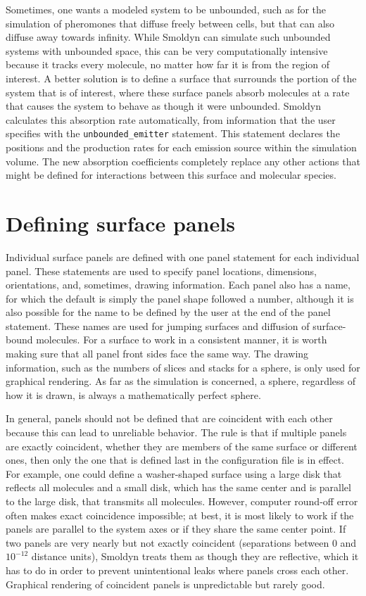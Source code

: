 \documentclass {book}
\newcommand {\ttt} {\texttt}
\begin{document}
Sometimes, one wants a modeled system to be unbounded, such as for the simulation of pheromones that diffuse freely between cells, but that can also diffuse away towards infinity. While Smoldyn can simulate such unbounded systems with unbounded space, this can be very computationally intensive because it tracks every molecule, no matter how far it is from the region of interest. A better solution is to define a surface that surrounds the portion of the system that is of interest, where these surface panels absorb molecules at a rate that causes the system to behave as though it were unbounded. Smoldyn calculates this absorption rate automatically, from information that the user specifies with the \ttt{unbounded\_emitter} statement. This statement declares the positions and the production rates for each emission source within the simulation volume. The new absorption coefficients completely replace any other actions that might be defined for interactions between this surface and molecular species.

\section{Defining surface panels}

Individual surface panels are defined with one panel statement for each individual panel. These statements are used to specify panel locations, dimensions, orientations, and, sometimes, drawing information. Each panel also has a name, for which the default is simply the panel shape followed a number, although it is also possible for the name to be defined by the user at the end of the panel statement. These names are used for jumping surfaces and diffusion of surface-bound molecules. For a surface to work in a consistent manner, it is worth making sure that all panel front sides face the same way. The drawing information, such as the numbers of slices and stacks for a sphere, is only used for graphical rendering. As far as the simulation is concerned, a sphere, regardless of how it is drawn, is always a mathematically perfect sphere.

In general, panels should not be defined that are coincident with each other because this can lead to unreliable behavior. The rule is that if multiple panels are exactly coincident, whether they are members of the same surface or different ones, then only the one that is defined last in the configuration file is in effect. For example, one could define a washer-shaped surface using a large disk that reflects all molecules and a small disk, which has the same center and is parallel to the large disk, that transmits all molecules. However, computer round-off error often makes exact coincidence impossible; at best, it is most likely to work if the panels are parallel to the system axes or if they share the same center point. If two panels are very nearly but not exactly coincident (separations between 0 and $10^{-12}$ distance units), Smoldyn treats them as though they are reflective, which it has to do in order to prevent unintentional leaks where panels cross each other. Graphical rendering of coincident panels is unpredictable but rarely good.
\end{document}
